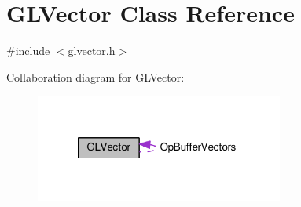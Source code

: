 \hypertarget{classGLVector}{
\section{\-G\-L\-Vector \-Class \-Reference}
\label{d4/db1/classGLVector}
}


{\ttfamily \#include $<$glvector.\-h$>$}



\-Collaboration diagram for \-G\-L\-Vector\-:
\nopagebreak
\begin{figure}[H]
\begin{center}
\leavevmode
\includegraphics[width=231pt]{d7/d5b/classGLVector__coll__graph}
\end{center}
\end{figure}
